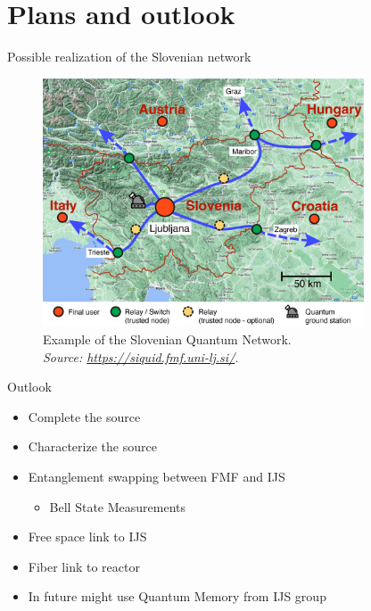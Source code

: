 \documentclass[serif,8pt]{beamer}
\begin{document}
\section{Plans and outlook}
\begin{frame}[t]{Possible realization of the Slovenian network}
	\begin{figure}
		\begin{center}
			\includegraphics[width=0.85\textwidth]{SI_network_with_groundstation.jpg}
		\end{center}
		\caption{Example of the Slovenian Quantum Network.\\\textit{Source: \url{https://siquid.fmf.uni-lj.si/}.}}
	\end{figure}
\end{frame}
	
\begin{frame}{Outlook}
	\begin{itemize}
		\item Complete the source
		\item Characterize the source
		\item Entanglement swapping between FMF and IJS
			\begin{itemize}
				\item Bell State Measurements %
			\end{itemize}
		\item Free space link to IJS
		\item Fiber link to reactor
		\item In future might use Quantum Memory from IJS group
	\end{itemize}
\end{frame}
\end{document}
